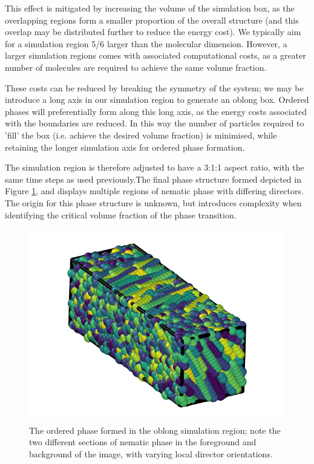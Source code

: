 \documentclass[11pt, a4paper]{article} %
\begin{document}
This effect is mitigated by increasing the volume of the simulation box, as the overlapping regions form a smaller proportion of the overall structure (and this overlap may be distributed further to reduce the energy cost). We typically aim for a simulation region 5/6 larger than the molecular dimension. However, a larger simulation regions comes with associated computational costs, as a greater number of molecules are required to achieve the same volume fraction.

These costs can be reduced by breaking the symmetry of the system; we may be introduce a long axis in our simulation region to generate an oblong box. Ordered phases will preferentially form along this long axis, as the energy costs associated with the boundaries are reduced. In this way the number of particles required to 'fill' the box (i.e. achieve the desired volume fraction) is minimised, while retaining the longer simulation axis for ordered phase formation.

The simulation region is therefore adjusted to have a 3:1:1 aspect ratio, with the same time steps as used previously.The final phase structure formed depicted in Figure \ref{fig:oblong_structure}, and displays multiple regions of nematic phase with differing directors. The origin for this phase structure is unknown, but introduces complexity when identifying the critical volume fraction of the phase transition.

\begin{figure}
	\centering
	\includegraphics[width=0.7\linewidth]{Figures/longrun2_oblong}
	\caption{The ordered phase formed in the oblong simulation region; note the two different sections of nematic phase in the foreground and background of the image, with varying local director orientations.}
	\label{fig:oblong_structure}
\end{figure}
\end{document}

